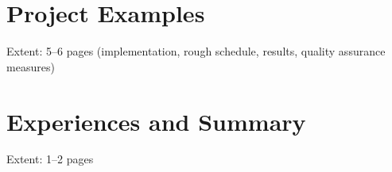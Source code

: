\documentclass[type=internship,theme=fhooe24,language=english,titlelanguage=english,smartquotes]{hgbthesis}
\begin{document}
     
\chapter{Project Examples}

Extent: 5--6 pages (implementation, rough schedule, results, quality assurance measures)


\chapter{Experiences and Summary}

Extent: 1--2 pages


\end{document}
